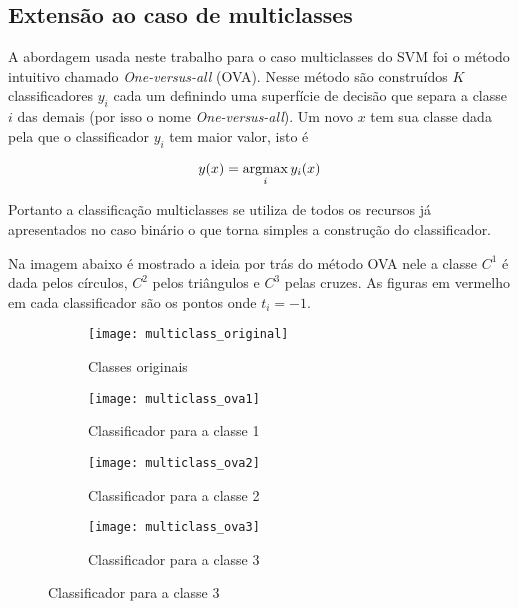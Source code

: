 \subsection{Extensão ao caso de multiclasses}

A abordagem usada neste trabalho para o caso multiclasses do SVM foi o método intuitivo chamado \textit{One-versus-all} (OVA).
 Nesse método são construídos $K$ classificadores $y_i$ cada um definindo uma
superfície de decisão que separa a classe $i$ das demais (por isso o nome \textit{One-versus-all}).
Um novo $x$ tem sua classe dada pela que o classificador $y_i$ tem maior valor, isto é

\begin{center}
	\begin{equation}
		y(x) = \operatorname*{argmax}_{i} y_i(x)
	\end{equation}
\end{center}

Portanto a classificação multiclasses se utiliza de todos os recursos já apresentados no caso
binário o que torna simples a construção do classificador.

Na imagem abaixo é mostrado a ideia por trás do método OVA nele a classe $C^1$ é dada pelos círculos,
$C^2$ pelos triângulos e $C^3$ pelas cruzes.
As figuras em vermelho em cada classificador são os pontos onde $t_i = -1$.

\begin{figure}[ht] 
  \begin{subfigure}[b]{0.5\linewidth}
    \centering
    \texttt{[image: multiclass\_original]} 
    \caption{Classes originais} 
    \vspace{4ex}
  \end{subfigure}%
  \begin{subfigure}[b]{0.5\linewidth}
    \centering
    \texttt{[image: multiclass\_ova1]} 
    \caption{Classificador para a classe 1} 
    \vspace{4ex}
  \end{subfigure} 
  \begin{subfigure}[b]{0.5\linewidth}
    \centering
    \texttt{[image: multiclass\_ova2]} 
    \caption{Classificador para a classe 2} 
  \end{subfigure}%
  \begin{subfigure}[b]{0.5\linewidth}
    \centering
    \texttt{[image: multiclass\_ova3]} 
    \caption{Classificador para a classe 3} 
  \end{subfigure} 

\end{figure}

